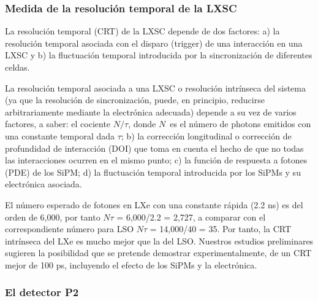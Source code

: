 \subsubsection*{Medida de la resolución temporal de la LXSC}

La resolución temporal (CRT) de la LXSC depende de dos factores: a) la resolución temporal asociada con el disparo (trigger) de una interacción en una LXSC y b) la fluctuación temporal introducida por la sincronización de diferentes celdas.

La resolución temporal asociada a una LXSC o resolución intrínseca del sistema (ya que la resolución de sincronización, puede, en principio, reducirse arbitrariamente mediante la electrónica adecuada) depende a su vez de varios factores, a saber: el cociente $N/\tau$, donde $N$~es el número de photons emitidos con una constante temporal dada $\tau$; b) la corrección longitudinal o corrección de profundidad de interacción (DOI) que toma en cuenta el hecho de que no todas las interacciones ocurren en el mismo punto; c) la función de respuesta a fotones (PDE) de los SiPM; d) la fluctuación temporal introducida por los SiPMs y su electrónica asociada. 

El número esperado de fotones en LXe con una constante rápida (2.2 ns) es del orden de 6,000, por tanto  $N\tau$ = 6,000/2.2 = 2,727, a comparar con el correspondiente número para LSO $N\tau$ = 14,000/40 = 35. Por tanto, la CRT intrínseca del LXe es mucho mejor que la del LSO.  Nuestros estudios preliminares sugieren la posibilidad que se pretende demostrar experimentalmente, de un CRT  mejor de 100 ps, incluyendo el efecto de los SiPMs y la electrónica. 

\subsubsection*{El detector P2}

\begin{center}  \end{center}

